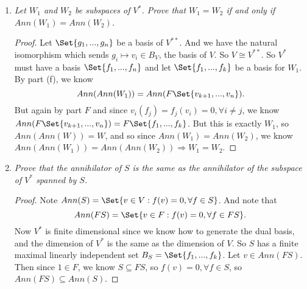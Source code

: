 \documentclass[9pt,reqno,twoside]{amsbook}
\theoremstyle{plain}
\numberwithin{section}{chapter}
\numberwithin{equation}{chapter}
\theoremstyle{definition}
\theoremstyle{remark}
\theoremstyle{plain}
\newcommand{\sub}{\subseteq}
\newcommand{\bb}{\vspace{3mm}}
\renewcommand{\leq}{\leqslant}
\begin{document}
\begin{enumerate}[label=\arabic*.]
\begin{enumerate}
\begin{proof}
Now we apply the result of part (c). We want to show $Ann(W_1 \cap W_2) \sub Ann(W_1) + Ann(W_2)$. By this result we know this is equivalent to showing:
$$
Ann(Ann(W_1 \cap W_2)) = W_1 \cap W_2 \sub Ann(Ann(W_1) + Ann(W_2)).
$$
So let $B_V$ be a basis for $V$, and let $B_{V^*}$ be a basis for $V^*$. Then let $\Set{f_1,...,k}$ be a basis for $W_1$ and define $\Set{f_l,...,f_m}$ as basis for $W_2$, without loss of generality, where $m,k \leq n = \dim V = \dim V^*$. Then by part (f) we know $Ann(W_1) = F(B_V \setminus \Set{f_1,...,f_k})$ and $Ann(W_2) = F(B_V \setminus \Set{f_l,...,f_m})$. So $Ann(W_1) + Ann(W_2) = A =  F(B_V \setminus (\Set{f_l,...,f_m}\cap \Set{f_1,...,f_k}))$. And by part (f) again we know $Ann(A) = F(B_{V^*} \setminus (B_{V^*} \setminus F(\Set{f_l,...,f_m}\cap \Set{f_1,...,f_k}))) = W_1 \cap W_2$. So we have proved the other inclusion, and we are done.  
\end{proof}
\bb
\item \textit{Let $W_1$ and $W_2$ be subspaces of $V^*$. Prove that $W_1 = W_2$ if and only if $Ann(W_1) = Ann(W_2)$. }
\bb

\begin{proof}
Let $\Set{g_1,...,g_n}$ be a basis of $V^{**}$. And we have the natural isomorphism which sends $g_i \mapsto v_i \in B_V$, the basis of $V$. So $V \cong V^{**}$. So $V^*$ must have a basis $\Set{f_1,...,f_n}$ and let $\Set{f_1,...,f_k}$ be a basis for $W_1$. By part (f), we know 
$$Ann(Ann(W_1)) = Ann(F\Set{v_{k + 1},...,v_n}).
$$
  But again by part $F$ and since $v_i(f_j) = f_j(v_i) = 0,\forall i\neq j$, we know $ Ann(F\Set{v_{k + 1},...,v_n}) = F\Set{f_1,...,f_k}$. But this is exactly $W_1$, so $Ann(Ann(W)) = W$, and so since $Ann(W_1) = Ann(W_2)$, we know $Ann(Ann(W_1)) = Ann(Ann(W_2)) \Rightarrow W_1 = W_2$. 
\end{proof}

\bb

\item \textit{Prove that the annihilator of $S$ is the same as the annihilator of the subspace of $V^*$ spanned by $S$. }

\bb

\begin{proof}
Note $Ann(S) = \Set{v \in V: f(v) = 0, \forall f \in S}$. And note that 
$$
Ann(FS) = \Set{v \in F:f(v) = 0,\forall f \in FS}.
$$
 Now $V^*$ is finite dimensional since we know how to generate the dual basis, and the dimension of $V^*$ is the same as the dimension of $V$. So $S$ has a finite maximal linearly independent set $B_S = \Set{f_1,...,f_k}$. Let $v \in Ann(FS)$. Then since $1 \in F$, we know $S \sub FS$, so $f(v) = 0,\forall f \in S$, so $Ann(FS) \sub Ann(S)$. 
 

\end{proof}
\end{enumerate}
\end{enumerate}
\end{document}
